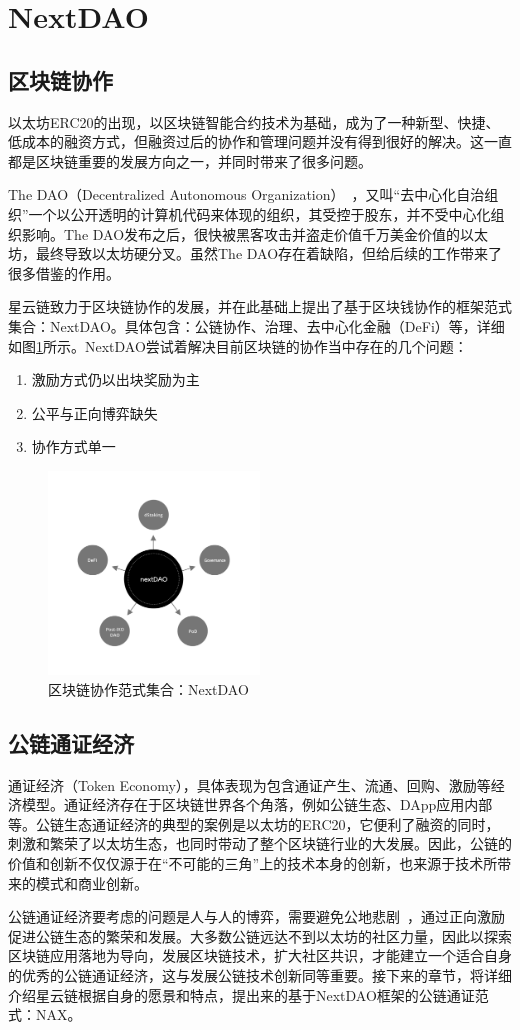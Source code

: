 \section{NextDAO}
\subsection{区块链协作}
以太坊ERC20的出现，以区块链智能合约技术为基础，成为了一种新型、快捷、低成本的融资方式，但融资过后的协作和管理问题并没有得到很好的解决。这一直都是区块链重要的发展方向之一，并同时带来了很多问题。

The DAO（Decentralized Autonomous Organization）~\cite{DAO}，又叫“去中心化自治组织”一个以公开透明的计算机代码来体现的组织，其受控于股东，并不受中心化组织影响。The DAO发布之后，很快被黑客攻击并盗走价值千万美金价值的以太坊，最终导致以太坊硬分叉。虽然The DAO存在着缺陷，但给后续的工作带来了很多借鉴的作用。

星云链致力于区块链协作的发展，并在此基础上提出了基于区块钱协作的框架范式集合：NextDAO。具体包含：公链协作、治理、去中心化金融（DeFi）等，详细如图\ref{fig:nextdao}所示。NextDAO尝试着解决目前区块链的协作当中存在的几个问题：

\begin{enumerate}[\hspace{1cm}(a)]
  \item 激励方式仍以出块奖励为主
  \item 公平与正向博弈缺失
  \item 协作方式单一
\end{enumerate}

\begin{figure}[htbp]
  \centering
  \includegraphics[width=0.5\textwidth]{../common/nextdao.pdf}
  \caption{区块链协作范式集合：NextDAO \label{fig:nextdao}}
\end{figure}

\subsection{公链通证经济}
通证经济（Token Economy），具体表现为包含通证产生、流通、回购、激励等经济模型。通证经济存在于区块链世界各个角落，例如公链生态、DApp应用内部等。公链生态通证经济的典型的案例是以太坊的ERC20，它便利了融资的同时，刺激和繁荣了以太坊生态，也同时带动了整个区块链行业的大发展。因此，公链的价值和创新不仅仅源于在“不可能的三角”上的技术本身的创新，也来源于技术所带来的模式和商业创新。

公链通证经济要考虑的问题是人与人的博弈，需要避免公地悲剧~\cite{TragedyOfTheCommons}，通过正向激励促进公链生态的繁荣和发展。大多数公链远达不到以太坊的社区力量，因此以探索区块链应用落地为导向，发展区块链技术，扩大社区共识，才能建立一个适合自身的优秀的公链通证经济，这与发展公链技术创新同等重要。接下来的章节，将详细介绍星云链根据自身的愿景和特点，提出来的基于NextDAO框架的公链通证范式：NAX。
